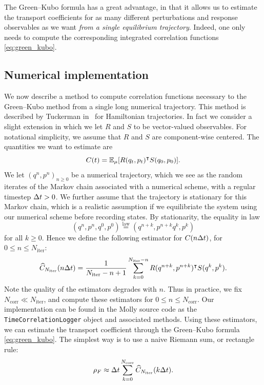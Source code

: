 The Green--Kubo formula has a great advantage, in that it allows us to estimate the transport coefficients for as many different perturbations and response observables as we want \emph{from a single equilibrium trajectory}.
Indeed, one only needs to compute the corresponding integrated correlation functions \eqref{eq:green_kubo}.
\subsection{Numerical implementation}
We now describe a method to compute correlation functions necessary to the Green--Kubo method from a single long numerical trajectory.
This method is described by Tuckerman in~\cite[Section 13.4.2]{T10} for Hamiltonian trajectories.
In fact we consider a slight extension in which we let $R$ and $S$ to be vector-valued observables.
For notational simplicity, we assume that $R$ and $S$ are component-wise centered. The quantities we want to estimate are 
\begin{equation}
    \label{eq:time_correlation}
    C(t)=\mathbb{E}_\mu[R(q_t,p_t)^\intercal S(q_0,p_0)].
\end{equation}
We let $(q^n,p^n)_{n\geq 0}$ be a numerical trajectory, which we see as the random iterates of the Markov chain associated with a numerical scheme, with a regular timestep ${\Delta t}>0$.
We further assume that the trajectory is stationary for this Markov chain, which is a realistic assumption if we equilibriate the system using our numerical scheme before recording states.
By stationarity, the equality in law
\[(q^n,p^n,q^0,p^0) \overset{\mathrm{law}}{=}(q^{n+k},p^{n+k}q^k,p^k)\]
for all $k\geq 0$. Hence we define the following estimator for $C(n{\Delta t})$, for $0\leq n\leq N_{\mathrm{iter}}:$
\begin{equation}
    \label{eq:ac_estimator}
    \widehat{C}_{N_{\mathrm{iter}}}(n{\Delta t}) = \frac{1}{N_{\mathrm{iter}}-n+1}\sum_{k=0}^{N_{\mathrm{iter}}-n}R(q^{n+k},p^{n+k})^\intercal S(q^k,p^k).
\end{equation}
Note the quality of the estimators degrades with $n$. Thus in practice, we fix $N_{\mathrm{corr}}\ll N_{\mathrm{iter}}$, and compute these estimators for $0\leq n \leq N_{\mathrm{corr}}$.
Our implementation can be found in the Molly \cite{Molly} source code as the \verb|TimeCorrelationLogger| object and associated methods.
Using these estimators, we can estimate the transport coefficient through the Green--Kubo formula \eqref{eq:green_kubo}. The simplest way is to use a naive Riemann sum, or rectangle rule:
\[\rho_F \approx {\Delta t}\sum_{k=0}^{N_{\mathrm{corr}}} \widehat{C}_{N_{\mathrm{iter}}}(k{\Delta t}).\]
